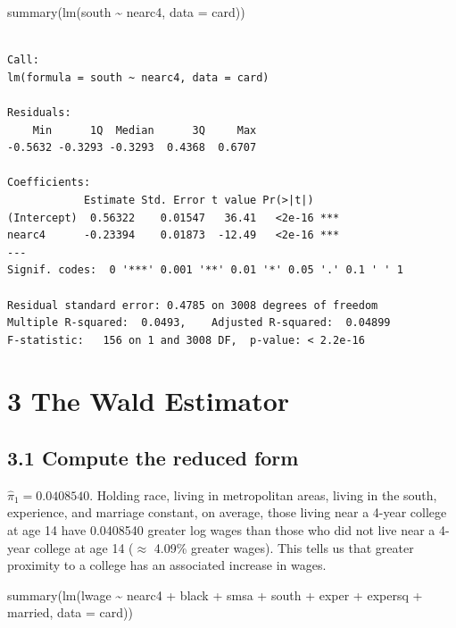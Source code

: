 \documentclass[
  letterpaper,
  DIV=11,
  numbers=noendperiod]{scrartcl}
\newenvironment{Shaded}{\begin{snugshade}}{\end{snugshade}}
\newcommand{\AttributeTok}[1]{\textcolor[rgb]{0.40,0.45,0.13}{#1}}
\newcommand{\FunctionTok}[1]{\textcolor[rgb]{0.28,0.35,0.67}{#1}}
\newcommand{\NormalTok}[1]{\textcolor[rgb]{0.00,0.23,0.31}{#1}}
\newcommand{\SpecialCharTok}[1]{\textcolor[rgb]{0.37,0.37,0.37}{#1}}
\begin{document}
\begin{Shaded}
\begin{Highlighting}[]
\FunctionTok{summary}\NormalTok{(}\FunctionTok{lm}\NormalTok{(south }\SpecialCharTok{\textasciitilde{}}\NormalTok{ nearc4, }\AttributeTok{data =}\NormalTok{ card))}
\end{Highlighting}
\end{Shaded}

\begin{verbatim}

Call:
lm(formula = south ~ nearc4, data = card)

Residuals:
    Min      1Q  Median      3Q     Max 
-0.5632 -0.3293 -0.3293  0.4368  0.6707 

Coefficients:
            Estimate Std. Error t value Pr(>|t|)    
(Intercept)  0.56322    0.01547   36.41   <2e-16 ***
nearc4      -0.23394    0.01873  -12.49   <2e-16 ***
---
Signif. codes:  0 '***' 0.001 '**' 0.01 '*' 0.05 '.' 0.1 ' ' 1

Residual standard error: 0.4785 on 3008 degrees of freedom
Multiple R-squared:  0.0493,    Adjusted R-squared:  0.04899 
F-statistic:   156 on 1 and 3008 DF,  p-value: < 2.2e-16
\end{verbatim}

\newpage

\section{3 The Wald Estimator}\label{the-wald-estimator}

\subsection{3.1 Compute the reduced
form}\label{compute-the-reduced-form}

\(\hat{\pi}_1 = 0.0408540\). Holding race, living in metropolitan areas,
living in the south, experience, and marriage constant, on average,
those living near a 4-year college at age 14 have 0.0408540 greater log
wages than those who did not live near a 4-year college at age 14
(\(\approx\) 4.09\% greater wages). This tells us that greater proximity
to a college has an associated increase in wages.

\begin{Shaded}
\begin{Highlighting}[]
\FunctionTok{summary}\NormalTok{(}\FunctionTok{lm}\NormalTok{(lwage }\SpecialCharTok{\textasciitilde{}}\NormalTok{ nearc4 }\SpecialCharTok{+}\NormalTok{ black }\SpecialCharTok{+}\NormalTok{ smsa }\SpecialCharTok{+}\NormalTok{ south }\SpecialCharTok{+}\NormalTok{ exper }\SpecialCharTok{+}\NormalTok{ expersq }
                         \SpecialCharTok{+}\NormalTok{ married, }\AttributeTok{data =}\NormalTok{ card))}
\end{Highlighting}
\end{Shaded}
\end{document}
